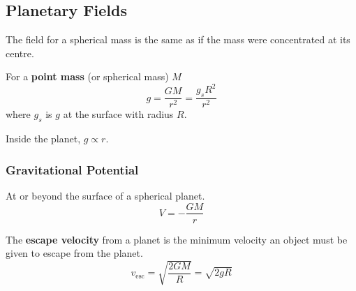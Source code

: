 \subsection{Planetary Fields}

The field for a spherical mass is the same as if the mass were concentrated at its centre.

For a \textbf{point mass} (or spherical mass) $M$
$$g=\frac{GM}{r^2}=\frac{g_sR^2}{r^2}$$
where $g_s$ is $g$ at the surface with radius $R$.

Inside the planet, $g\propto r$.

\subsubsection*{Gravitational Potential}
At or beyond the surface of a spherical planet.
$$V=-\frac{GM}{r}$$

The \textbf{escape velocity} from a planet is the minimum velocity an object must be given to escape from the planet.
$$v_\text{esc}=\sqrt{\frac{2GM}{R}}=\sqrt{2gR}$$
